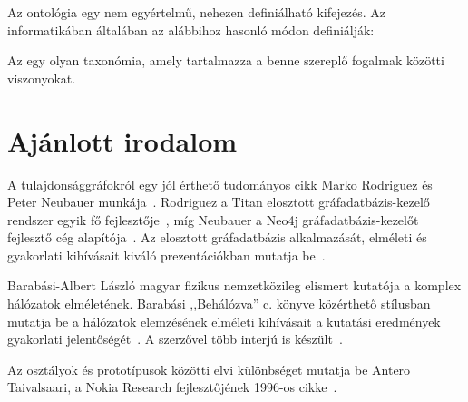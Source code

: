 Az ontológia egy nem egyértelmű, nehezen definiálható kifejezés. Az informatikában általában az alábbihoz hasonló módon definiálják:

\begin{definicio}
Az  egy olyan taxonómia, amely tartalmazza a benne szereplő fogalmak közötti viszonyokat. 
\end{definicio}

\section{Ajánlott irodalom}

A tulajdonsággráfokról egy jól érthető tudományos cikk Marko Rodriguez és Peter Neubauer munkája~\cite{Rodriguez2010}. Rodriguez a Titan elosztott gráfadatbázis-kezelő rendszer egyik fő fejlesztője~\cite{Titan}, míg Neubauer a Neo4j gráfadatbázis-kezelőt fejlesztő cég alapítója~\cite{Neo4j}. Az elosztott gráfadatbázis alkalmazását, elméleti és gyakorlati kihívásait kiváló prezentációkban mutatja be~\cite{RodriguezSlides2012,RodriguezSlides2013}.

Barabási-Albert László magyar fizikus nemzetközileg elismert kutatója a komplex hálózatok elméletének. Barabási ,,Behálózva'' c. könyve közérthető stílusban mutatja be a hálózatok elemzésének elméleti kihívásait a kutatási eredmények gyakorlati jelentőségét~\cite{behalozva}. A szerzővel több interjú is készült~\cite{barabasi1,barabasi2,barabasi3}.

Az osztályok és prototípusok közötti elvi különbséget mutatja be Antero Taivalsaari, a Nokia Research fejlesztőjének 1996-os cikke~\cite{taivalsaari1996classes}.

